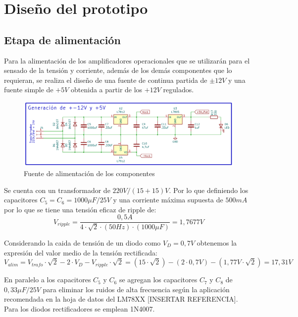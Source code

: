   \chapter{Diseño del prototipo}



\section{Etapa de alimentación} \par
Para la alimentación de los amplificadores operacionales que se utilizarán para el sensado de la tensión y corriente, además de los demás componentes que lo requieran, se realiza el diseño de una fuente de continua partida de $\pm 12V$ y una fuente simple de $+5V$ obtenida a partir de los $+12V$ regulados. \par
\begin{figure} [H]
	\centering
	\includegraphics[width=\textwidth]{./imagenes/Alimentacion_analogica.png}
	\caption{Fuente de alimentación de los componentes}
	\label{F:alimentacion_analogica}
\end{figure} \par 
Se cuenta con un transformador de $220V/(15+15)V$. Por lo que definiendo los capacitores $C_5 =C_6 =1000\mu F/25V$ y una corriente máxima supuesta de $500mA$ por lo que se tiene una tensión eficaz de ripple de:
\begin{equation}
	V_{ripple} =\frac{0,5A}{4\cdot \sqrt{2}\cdot (50Hz)\cdot (1000\mu F)}=1,7677V
\end{equation} \par
Considerando la caida de tensión de un diodo como $V_D =0,7V$ obtenemos la expresión del valor medio de la tensión rectificada:
\begin{equation}
V_{alim} =V_{trafo} \cdot \sqrt{2}-2\cdot V_D -V_{ripple} \cdot \sqrt{2}=(15\cdot \sqrt{2})-(2\cdot 0,7V)-(1,77V\cdot \sqrt{2})=17,31V
\end{equation} \par
En paralelo a los capacitores $C_5$ y $C_6$ se agregan los capacitores $C_7$ y $C_8$ de $0,33\mu F/25V$ para eliminar los ruidos de alta frecuencia según la aplicación recomendada en la hoja de datos del LM78XX [INSERTAR REFERENCIA]. Para los diodos rectificadores se emplean 1N4007.\par
